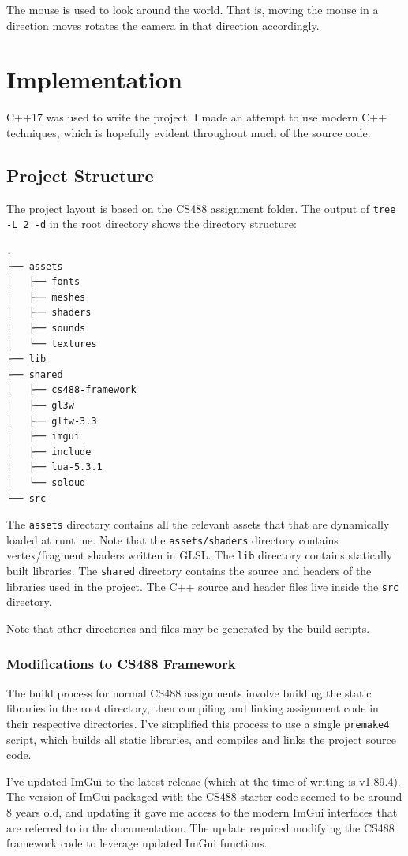 \documentclass {article}
\begin{document}
The mouse is used to look around the world. That is, moving the mouse in a direction moves rotates the camera in that direction accordingly.

\section{Implementation}\label{sec:implementation}
C++17 was used to write the project. I made an attempt to use modern C++ techniques, which is hopefully evident throughout much of the source code.

\subsection{Project Structure}\label{sec:structure}
The project layout is based on the CS488 assignment folder. The output of \texttt{tree -L 2 -d} in the root directory shows the directory structure:
\begin{verbatim}
.
├── assets
│   ├── fonts
│   ├── meshes
│   ├── shaders
│   ├── sounds
│   └── textures
├── lib
├── shared
│   ├── cs488-framework
│   ├── gl3w
│   ├── glfw-3.3
│   ├── imgui
│   ├── include
│   ├── lua-5.3.1
│   └── soloud
└── src
\end{verbatim}

The \texttt{assets} directory contains all the relevant assets that that are dynamically loaded at runtime. Note that the \texttt{assets/shaders} directory contains vertex/fragment shaders written in GLSL. The \texttt{lib} directory contains statically built libraries. The \texttt{shared} directory contains the source and headers of the libraries used in the project. The C++ source and header files live inside the \texttt{src} directory.

Note that other directories and files may be generated by the build scripts.

\subsubsection{Modifications to CS488 Framework}
The build process for normal CS488 assignments involve building the static libraries in the root directory, then compiling and linking assignment code in their respective directories. I've simplified this process to use a single \texttt{premake4} script, which builds all static libraries, and compiles and links the project source code.

I've updated ImGui to the latest release (which at the time of writing is \href{https://github.com/ocornut/imgui/releases/tag/v1.89.4}{v1.89.4}). The version of ImGui packaged with the CS488 starter code seemed to be around 8 years old, and updating it gave me access to the modern ImGui interfaces that are referred to in the documentation. The update required modifying the CS488 framework code to leverage updated ImGui functions.
\end{document}
